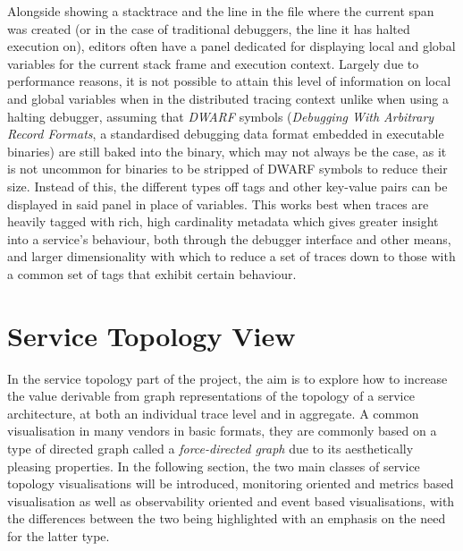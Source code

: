 \documentclass[12pt,pdftex,titlepage]{report}
\begin{document}
            Alongside showing a stacktrace and the line in the file where the current span was created (or in the case of traditional debuggers, the line it has halted execution on),
            editors often have a panel dedicated for displaying local and global variables for the current stack frame and execution context. Largely due to performance reasons, it is
            not possible to attain this level of information on local and global variables when in the distributed tracing context unlike when using a halting debugger, assuming that 
            \textit{DWARF} symbols (\textit{Debugging With Arbitrary Record Formats}, a standardised debugging data format embedded in executable binaries)\cite{dwarf} are still baked 
            into the binary, which may not always be the case, as it is not uncommon for binaries to be stripped of DWARF symbols to reduce their size. Instead of this, the different types off
            tags and other key-value pairs can be displayed in said panel in place of variables. This works best when traces are heavily tagged with rich, high cardinality metadata which gives 
            greater insight into a service's behaviour, both through the debugger interface and other means, and larger dimensionality with which to reduce a set of traces down to those with 
            a common set of tags that exhibit certain behaviour.

        \section{Service Topology View}
            In the service topology part of the project, the aim is to explore how to increase the value derivable from graph representations of the topology of a service architecture, at 
            both an individual trace level and in aggregate. A common visualisation in many vendors in basic formats, they are commonly based on a type of directed graph called a 
            \textit{force-directed graph} due to its aesthetically pleasing properties. In the following section, the two main classes of service topology visualisations will be introduced,
            monitoring oriented and metrics based visualisation as well as observability oriented and event based visualisations, with the differences between the two being highlighted with an 
            emphasis on the need for the latter type.
    
\end{document}
